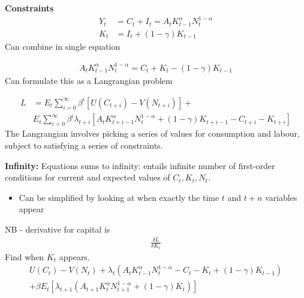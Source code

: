 \documentclass{beamer}
\begin{document}
\begin{frame}
  \textbf{Constraints}  
\begin{align}
  Y_t &= C_t + I_t = A_tK^\alpha_{t-1}N^{1-\alpha}_t\\ \nonumber
  K_t &= I_t + (1-\gamma)K_{t-1}
\end{align}
 Can combine in single equation

\begin{align}
  A_tK^\alpha_{t-1}N^{1-\alpha}_t=C_t + K_t - (1-\gamma)K_{t-1}
\end{align}
Can formulate this as a Langrangian problem

\end{frame}

\begin{frame} 
\begin{align}
  L &= E_t \sum^{\infty}_{i=0}\beta^i[U(C_{t+i}) - V(N_{t+i})] +\\ \nonumber
  & E_t \sum^{\infty}_{i=0}\beta^i \lambda_{t+i} [A_tK^\alpha_{t+i-1}N^{1-\alpha}_t + (1-\gamma)K_{t+i-1} - C_{t+i} - K_{t+i}]
\end{align}
 The Langrangian involves picking a series of values for consumption and labour, subject to satisfying a series of constraints. 
\end{frame}

\begin{frame}
  \textbf{Infinity:} Equations sums to infinity: entails infinite number of first-order conditions for current and expected values of $C_t, K_t,N_t$.
  \begin{itemize}
    \item Can be simplified by looking at when exactly the time $t$ and $t+n$ variables appear
  \end{itemize}
  NB - derivative for capital is 
  \begin{align}
    \frac{\delta L}{\delta K_t}
  \end{align}
  Find when $K_t$ appears.
\begin{align}
  U(C_t)-V(N_t)+ \lambda_t(A_tK^\alpha_{t-1}N^{1-\alpha}_t -C_t -K_t + (1-\gamma)K_{t-1}) \\ \nonumber
  + \beta E_t[\lambda_{t+1}(A_{t+1}K^\alpha_{t}N^{1-\alpha}_{t+1}+(1-\gamma)K_t)]
\end{align}
\end{frame}
\end{document}
